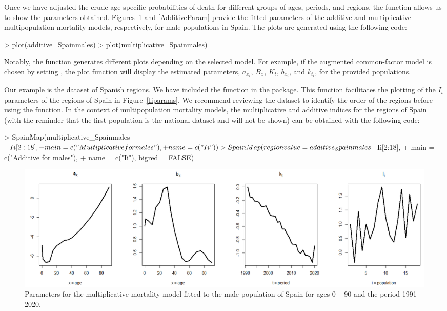 Once we have adjusted the crude age-specific probabilities of death for different groups of ages, periods, and regions, the  function allows us to show the parameters obtained. Figures~\ref{MultipliParam} and \ref{AdditiveParam} provide the fitted parameters of the additive and multiplicative multipopulation mortality models, respectively, for male populations in Spain. The plots are generated using the following code:
%
\begin{example}
> plot(additive_Spainmales)
> plot(multiplicative_Spainmales)
\end{example}
%
Notably, the  function generates different plots depending on the selected model. For example, if the augmented common-factor model is chosen by setting , the plot function will display the estimated parameters, $a_{x_i}$, $B_x$, $K_t$, $b_{x_i}$, and $k_{t_i}$, for the provided populations.

Our example is the dataset of Spanish regions. We have included the  function in the package. This function facilitates the plotting of the $I_i$ parameters of the regions of Spain in Figure~\ref{Iiparams}. We recommend reviewing the  dataset to identify the order of the regions before using the  function. In the context of multipopulation mortality models, the multiplicative and additive indices for the regions of Spain (with the reminder that the first population is the national dataset and will not be shown) can be obtained with the following code:
%
\begin{example}
> SpainMap(multiplicative_Spainmales$Ii[2:18],
+	main = c("Multiplicative for males"),
+	name = c("Ii"))
> SpainMap(regionvalue = additive_Spainmales$Ii[2:18],
+	main = c("Additive for males"),
+	name = c("Ii"), bigred = FALSE)
\end{example}
%
\begin{figure}[h!]
\centering
\includegraphics*[width=\textwidth]{parametros_Mult_male.png}
\caption{Parameters for the multiplicative mortality model fitted to the male population of Spain for ages 0 – 90 and the period 1991 – 2020.}
\label{MultipliParam}
\end{figure}


